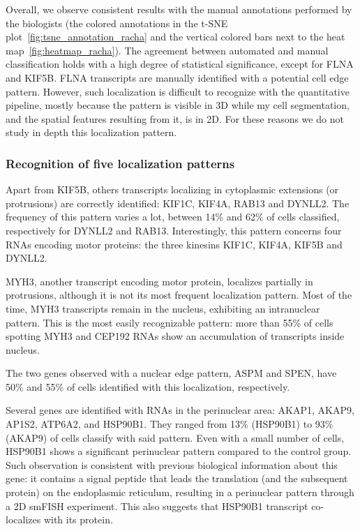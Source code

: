 Overall, we observe consistent results with the manual annotations performed by the biologists (the colored annotations in the \ac{t-SNE} plot~\ref{fig:tsne_annotation_racha} and the vertical colored bars next to the heat map~\ref{fig:heatmap_racha}).
The agreement between automated and manual classification holds with a high degree of statistical significance, except for FLNA and KIF5B.
FLNA transcripts are manually identified with a potential cell edge pattern.
However, such localization is difficult to recognize with the quantitative pipeline, mostly because the pattern is visible in 3D while my cell segmentation, and the spatial features resulting from it, is in 2D.
For these reasons we do not study in depth this localization pattern.

\subsubsection{Recognition of five localization patterns}

Apart from KIF5B, others transcripts localizing in cytoplasmic extensions (or protrusions) are correctly identified: KIF1C, KIF4A, RAB13 and DYNLL2.
The frequency of this pattern varies a lot, between 14\% and 62\% of cells classified, respectively for DYNLL2 and RAB13.
Interestingly, this pattern concerns four \ac{RNA}s encoding motor proteins: the three kinesins KIF1C, KIF4A, KIF5B and DYNLL2.

MYH3, another transcript encoding motor protein, localizes partially in protrusions, although it is not its most frequent localization pattern.
Most of the time, MYH3 transcripts remain in the nucleus, exhibiting an intranuclear pattern.
This is the most easily recognizable pattern: more than 55\% of cells spotting MYH3 and CEP192 \ac{RNA}s show an accumulation of transcripts inside nucleus.

The two genes observed with a nuclear edge pattern, ASPM and SPEN, have 50\% and 55\% of cells identified with this localization, respectively.

Several genes are identified with \ac{RNA}s in the perinuclear area: AKAP1, AKAP9, AP1S2, ATP6A2, and HSP90B1.
They ranged from 13\% (HSP90B1) to 93\% (AKAP9) of cells classify with said pattern.
Even with a small number of cells, HSP90B1 shows a significant perinuclear pattern compared to the control group.
Such observation is consistent with previous biological information about this gene: it contains a signal peptide that leads the translation (and the subsequent protein) on the endoplasmic reticulum, resulting in a perinuclear pattern through a 2D \ac{smFISH} experiment.
This also suggests that HSP90B1 transcript co-localizes with its protein.

